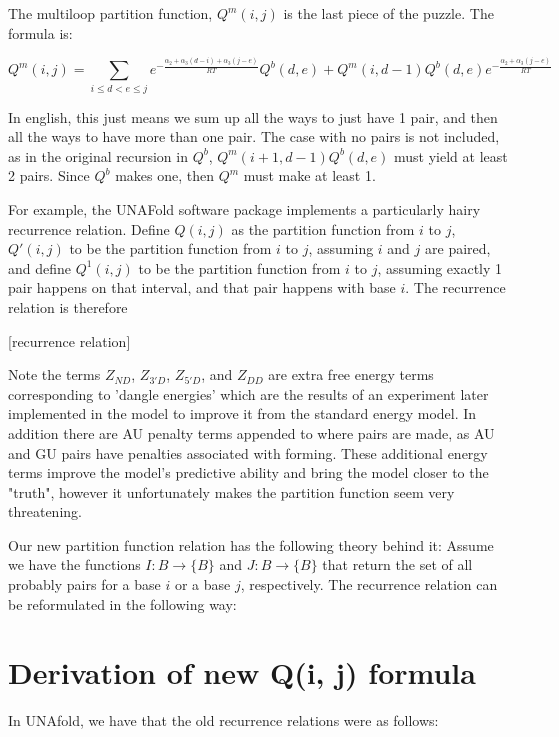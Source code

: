 The multiloop partition function, $Q^m(i, j)$ is the last piece of the
puzzle. The formula is:

\begin{equation} Q^m(i, j) = \sum_{i \leq d < e \leq j}
e^{-\frac{\alpha_2 + \alpha_3(d-i) + \alpha_3(j-e)}{RT}} Q^b(d,e) +
Q^m(i, d - 1)Q^b(d, e) e^{-\frac{\alpha_2 + \alpha_3(j-e)}{RT}}
\end{equation}

In english, this just means we sum up all the ways to just have 1
pair, and then all the ways to have more than one pair. The case with
no pairs is not included, as in the original recursion in $Q^b$,
$Q^m(i+1, d-1)Q^b(d,e)$ must yield at least 2 pairs. Since $Q^b$ makes
one, then $Q^m$ must make at least 1.

For example, the UNAFold software package implements a particularly
hairy recurrence relation. Define $Q(i,j)$ as the partition function
from $i$ to $j$, $Q'(i,j)$ to be the partition function from $i$ to
$j$, assuming $i$ and $j$ are paired, and define $Q^1(i,j)$ to be the
partition function from $i$ to $j$, assuming exactly 1 pair happens on
that interval, and that pair happens with base $i$. The recurrence
relation is therefore

[recurrence relation]

Note the terms $Z_{ND}$, $Z_{3'D}$, $Z_{5'D}$, and $Z_{DD}$ are extra
free energy terms corresponding to 'dangle energies' which are the
results of an experiment later implemented in the model to improve it
from the standard energy model. In addition there are AU penalty terms
appended to where pairs are made, as AU and GU pairs have penalties
associated with forming. These additional energy terms improve the
model's predictive ability and bring the model closer to the "truth",
however it unfortunately makes the partition function seem very
threatening.

Our new partition function relation has the following theory behind
it: Assume we have the functions $I : B \to \{B\}$ and $J : B \to
\{B\}$ that return the set of all probably pairs for a base $i$ or a
base $j$, respectively. The recurrence relation can be reformulated in
the following way:

\section{Derivation of new Q(i, j) formula}

In UNAfold, we have that the old recurrence relations were as follows:

